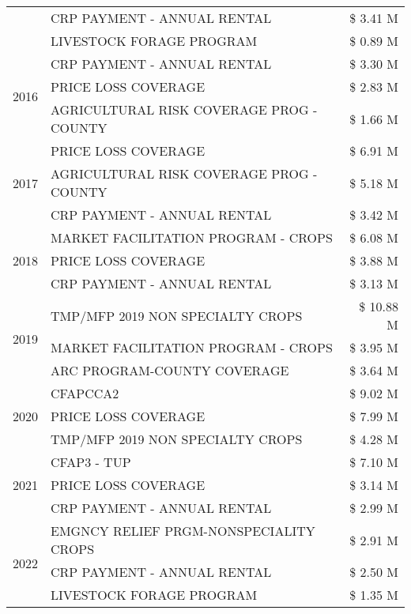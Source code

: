\begin{tabular}{llr}
 & CRP PAYMENT - ANNUAL RENTAL & \$ 3.41 M \\
 & LIVESTOCK FORAGE PROGRAM & \$ 0.89 M \\
\cline{1-3}
\multirow[t]{3}{*}{2016} & CRP PAYMENT - ANNUAL RENTAL & \$ 3.30 M \\
 & PRICE LOSS COVERAGE & \$ 2.83 M \\
 & AGRICULTURAL RISK COVERAGE PROG - COUNTY & \$ 1.66 M \\
\cline{1-3}
\multirow[t]{3}{*}{2017} & PRICE LOSS COVERAGE & \$ 6.91 M \\
 & AGRICULTURAL RISK COVERAGE PROG - COUNTY & \$ 5.18 M \\
 & CRP PAYMENT - ANNUAL RENTAL & \$ 3.42 M \\
\cline{1-3}
\multirow[t]{3}{*}{2018} & MARKET FACILITATION PROGRAM - CROPS & \$ 6.08 M \\
 & PRICE LOSS COVERAGE & \$ 3.88 M \\
 & CRP PAYMENT - ANNUAL RENTAL & \$ 3.13 M \\
\cline{1-3}
\multirow[t]{3}{*}{2019} & TMP/MFP 2019 NON SPECIALTY CROPS & \$ 10.88 M \\
 & MARKET FACILITATION PROGRAM - CROPS & \$ 3.95 M \\
 & ARC PROGRAM-COUNTY COVERAGE & \$ 3.64 M \\
\cline{1-3}
\multirow[t]{3}{*}{2020} & CFAPCCA2 & \$ 9.02 M \\
 & PRICE LOSS COVERAGE & \$ 7.99 M \\
 & TMP/MFP 2019 NON SPECIALTY CROPS & \$ 4.28 M \\
\cline{1-3}
\multirow[t]{3}{*}{2021} & CFAP3 - TUP & \$ 7.10 M \\
 & PRICE LOSS COVERAGE & \$ 3.14 M \\
 & CRP PAYMENT - ANNUAL RENTAL & \$ 2.99 M \\
\cline{1-3}
\multirow[t]{3}{*}{2022} & EMGNCY RELIEF PRGM-NONSPECIALITY CROPS & \$ 2.91 M \\
 & CRP PAYMENT - ANNUAL RENTAL & \$ 2.50 M \\
 & LIVESTOCK FORAGE PROGRAM & \$ 1.35 M \\
\cline{1-3}
\bottomrule
\end{tabular}
